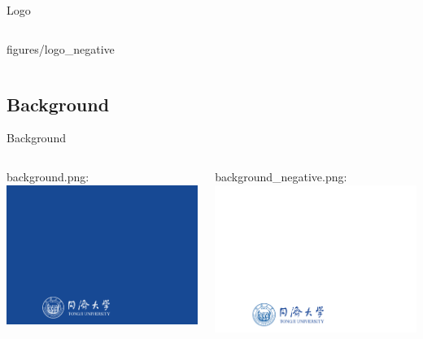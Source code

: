 \documentclass{beamer}
\begin{document}
\begin{frame}[fragile]{Logo}
\begin{columns}
\begin{column}{0.3\textwidth}
{figures/logo_negative}
\end{column}
\end{columns}
\end{frame}


\subsection{Background}

\begin{frame}[fragile]{Background}
\begin{columns}
\begin{column}{0.45\textwidth}
background.png:
\includegraphics[width=\textwidth]
{figures/background}
\end{column}
\begin{column}{0.45\textwidth}
background\_negative.png:
\includegraphics[width=\textwidth]
{figures/background_negative}
\end{column}
\end{columns}
\end{frame}
\end{document}
